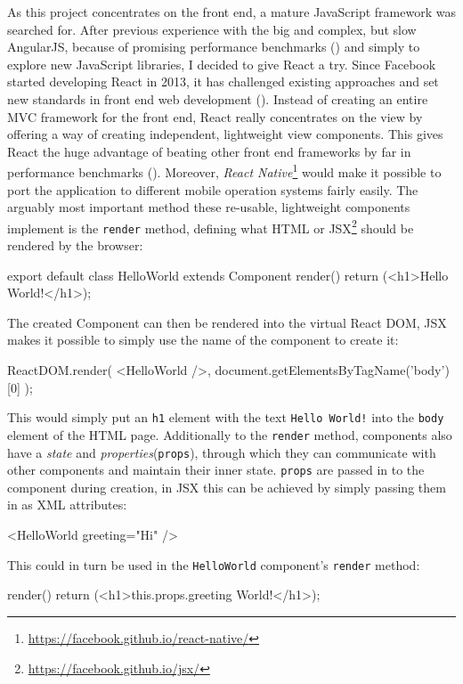 As this project concentrates on the front end, a mature JavaScript framework was searched for. After previous experience with the big and complex, but slow AngularJS, because of promising performance benchmarks (\cite{react-benchmarks}) and simply to explore new JavaScript libraries, I decided to give React a try. Since Facebook started developing React in 2013, it has challenged existing approaches and set new standards in front end web development (\cite{introduction-to-react}). Instead of creating an entire MVC framework for the front end, React really concentrates on the view by offering a way of creating independent, lightweight view components. This gives React the huge advantage of beating other front end frameworks by far in performance benchmarks (\cite{react-benchmarks}). Moreover, \emph{React Native}\footnote{\url{https://facebook.github.io/react-native/}} would make it possible to port the application to different mobile operation systems fairly easily.
The arguably most important method these re-usable, lightweight components implement is the \texttt{render} method, defining what HTML or JSX\footnote{\url{https://facebook.github.io/jsx/}} should be rendered by the browser:
\begin{JsCode}
export default class HelloWorld extends Component {
  render() {
    return (<h1>Hello World!</h1>);
  }
}
\end{JsCode}
%
The created Component can then be rendered into the virtual React DOM, JSX makes it possible to simply use the name of the component to create it:
%
\begin{JsCode}
ReactDOM.render(
  <HelloWorld />,
  document.getElementsByTagName('body')[0]
);
\end{JsCode}
%
This would simply put an \texttt{h1} element with the text \texttt{Hello World!} into the \texttt{body} element of the HTML page. Additionally to the \texttt{render} method, components also have a \emph{state} and \emph{properties}(\texttt{props}), through which they can communicate with other components and maintain their inner state. \texttt{props} are passed in to the component during creation, in JSX this can be achieved by simply passing them in as XML attributes:
%
\begin{JsCode}
  <HelloWorld greeting="Hi" />
\end{JsCode}
%
This could in turn be used in the \texttt{HelloWorld} component's \texttt{render} method:
%
\begin{JsCode}
  render() {
    return (<h1>{this.props.greeting} World!</h1>);
  }
\end{JsCode}
